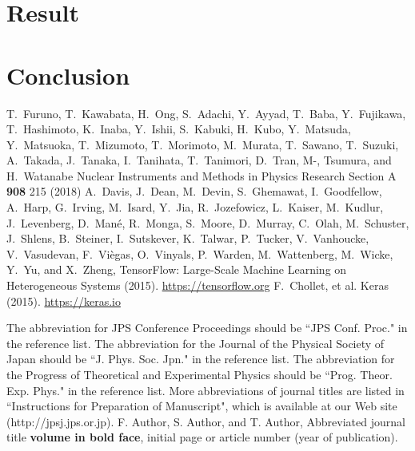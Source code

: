 \documentclass{jps-cp}
\begin{document}
\section{Result}

\section{Conclusion}



\begin{thebibliography}{9}
  T.~Furuno, T.~Kawabata, H.~Ong, S.~Adachi, Y.~Ayyad, T.~Baba, Y.~Fujikawa, T.~Hashimoto, K.~Inaba, Y.~Ishii,
  S.~Kabuki, H.~Kubo, Y.~Matsuda, Y.~Matsuoka, T.~Mizumoto, T.~Morimoto, M.~Murata, T.~Sawano, T.~Suzuki, A.~Takada,
  J.~Tanaka, I.~Tanihata, T.~Tanimori, D.~Tran, M-, Tsumura, and H.~Watanabe
  Nuclear Instruments and Methods in Physics Research Section A \textbf{908} 215 (2018)
  A.~Davis, J.~Dean, M.~Devin, S.~Ghemawat, I.~Goodfellow, A.~Harp, G.~Irving,
  M.~Isard, Y.~Jia, R.~Jozefowicz, L.~Kaiser, M.~Kudlur, J.~Levenberg,
  D.~Man\'{e}, R.~Monga, S.~Moore, D.~Murray, C.~Olah, M.~Schuster, J.~Shlens,
  B.~Steiner, I.~Sutskever, K.~Talwar, P.~Tucker, V.~Vanhoucke, V.~Vasudevan,
  F.~Vi\`{e}gas, O.~Vinyals, P.~Warden, M.~Wattenberg, M.~Wicke, Y.~Yu, and
  X.~Zheng, {TensorFlow: Large-Scale Machine Learning on Heterogeneous Systems} (2015).
  \url{https://tensorflow.org}
  F.~Chollet, et al. {Keras} (2015). \url{https://keras.io}

 The abbreviation for JPS Conference Proceedings should be ``JPS Conf. Proc." in the reference list.
 The abbreviation for the Journal of the Physical Society of Japan should be ``J. Phys. Soc. Jpn." in the reference list.
 The abbreviation for the Progress of Theoretical and Experimental Physics should be ``Prog. Theor. Exp. Phys." in the reference list.
 More abbreviations of journal titles are listed in ``Instructions for Preparation of Manuscript", which is available at our Web site (http://jpsj.jps.or.jp).
 F. Author, S. Author, and T. Author, Abbreviated journal title \textbf{volume in bold face}, initial page or article number (year of publication).
\end{thebibliography}
\end{document}
